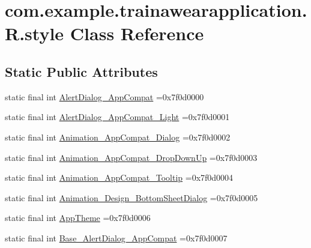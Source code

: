 \hypertarget{classcom_1_1example_1_1trainawearapplication_1_1_r_1_1style}{}\section{com.\+example.\+trainawearapplication.\+R.\+style Class Reference}
\label{classcom_1_1example_1_1trainawearapplication_1_1_r_1_1style}
\subsection*{Static Public Attributes}
\begin{DoxyCompactItemize}
\item 
static final int \mbox{\hyperlink{classcom_1_1example_1_1trainawearapplication_1_1_r_1_1style_a6c6c5b5e7f828c4d2c7b7a8ca1b6c5a0}{Alert\+Dialog\+\_\+\+App\+Compat}} =0x7f0d0000
\item 
static final int \mbox{\hyperlink{classcom_1_1example_1_1trainawearapplication_1_1_r_1_1style_ac27ef05ababdb93dcee0fe01352f7801}{Alert\+Dialog\+\_\+\+App\+Compat\+\_\+\+Light}} =0x7f0d0001
\item 
static final int \mbox{\hyperlink{classcom_1_1example_1_1trainawearapplication_1_1_r_1_1style_afd1be407b402bbbf214851fcab35718c}{Animation\+\_\+\+App\+Compat\+\_\+\+Dialog}} =0x7f0d0002
\item 
static final int \mbox{\hyperlink{classcom_1_1example_1_1trainawearapplication_1_1_r_1_1style_a23ce320e4f436fff568957b0071998fa}{Animation\+\_\+\+App\+Compat\+\_\+\+Drop\+Down\+Up}} =0x7f0d0003
\item 
static final int \mbox{\hyperlink{classcom_1_1example_1_1trainawearapplication_1_1_r_1_1style_aa2547346cf8395b61dc6489bf75e85d3}{Animation\+\_\+\+App\+Compat\+\_\+\+Tooltip}} =0x7f0d0004
\item 
static final int \mbox{\hyperlink{classcom_1_1example_1_1trainawearapplication_1_1_r_1_1style_ab79b2219b43f86121087b08d2b5e1881}{Animation\+\_\+\+Design\+\_\+\+Bottom\+Sheet\+Dialog}} =0x7f0d0005
\item 
static final int \mbox{\hyperlink{classcom_1_1example_1_1trainawearapplication_1_1_r_1_1style_aff25cb78938675c7133dec5872a249ad}{App\+Theme}} =0x7f0d0006
\item 
static final int \mbox{\hyperlink{classcom_1_1example_1_1trainawearapplication_1_1_r_1_1style_ab621f7d084b6578c339b1a18f9ae240b}{Base\+\_\+\+Alert\+Dialog\+\_\+\+App\+Compat}} =0x7f0d0007
\item 

\end{DoxyCompactItemize}
